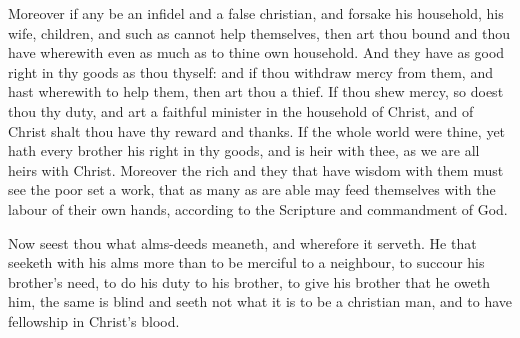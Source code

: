 Moreover if any be an infidel and a false christian, and 
forsake his household, his wife, children, and such as cannot
help themselves, then art thou bound and thou have 
wherewith even as much as to thine own household. And 
they have as good right in thy goods as thou thyself: 
and if thou withdraw mercy from them, and hast wherewith 
to help them, then art thou a thief. If thou shew mercy, 
so doest thou thy duty, and art a faithful minister in the 
household of Christ, and of Christ shalt thou have thy reward
and thanks. If the whole world were thine, yet hath 
every brother his right in thy goods, and is heir with thee, 
as we are all heirs with Christ. Moreover the rich and they 
that have wisdom with them must see the poor set a work, 
that as many as are able may feed themselves with the labour
of their own hands, according to the Scripture and 
commandment of God. 

Now seest thou what alms-deeds meaneth, and wherefore 
it serveth. He that seeketh with his alms more than to be merciful
to a neighbour, to succour his brother's need, to do his 
duty to his brother, to give his brother that he oweth him, 
the same is blind and seeth not what it is to be a christian 
man, and to have fellowship in Christ's blood. 

